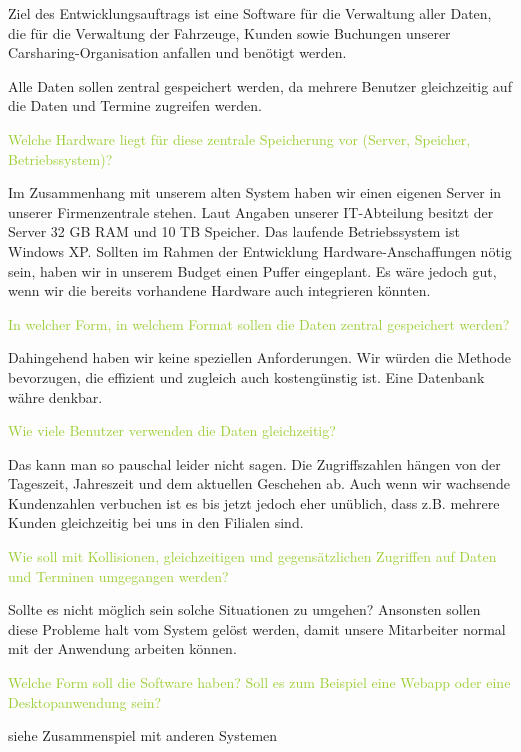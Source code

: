 Ziel des Entwicklungsauftrags ist eine Software für die Verwaltung aller Daten, die für die Verwaltung der Fahrzeuge, Kunden sowie Buchungen unserer Carsharing-Organisation anfallen und benötigt werden. 

Alle Daten sollen zentral gespeichert werden, da mehrere Benutzer gleichzeitig auf die Daten und Termine zugreifen werden. 

\textcolor{YellowGreen}{Welche Hardware liegt für diese zentrale Speicherung vor (Server, Speicher, Betriebssystem)?}

\textcolor{NavyBlue}{Im Zusammenhang mit unserem alten System haben wir einen eigenen Server in unserer Firmenzentrale stehen. Laut Angaben unserer IT-Abteilung besitzt der Server 32 GB RAM und 10 TB Speicher. Das laufende Betriebssystem ist Windows XP.
Sollten im Rahmen der Entwicklung Hardware-Anschaffungen nötig sein, haben wir in unserem Budget einen Puffer eingeplant. Es wäre jedoch gut, wenn wir die bereits vorhandene Hardware auch integrieren könnten.}

\textcolor{YellowGreen}{In welcher Form, in welchem Format sollen die Daten zentral gespeichert werden?}

\textcolor{NavyBlue}{Dahingehend haben wir keine speziellen Anforderungen. Wir würden die Methode bevorzugen, die effizient und zugleich auch kostengünstig ist. Eine Datenbank währe denkbar.}

\textcolor{YellowGreen}{Wie viele Benutzer verwenden die Daten gleichzeitig?}

\textcolor{NavyBlue}{Das kann man so pauschal leider nicht sagen. Die Zugriffszahlen hängen von der Tageszeit, Jahreszeit und dem aktuellen Geschehen ab. Auch wenn wir wachsende Kundenzahlen verbuchen ist es bis jetzt jedoch eher unüblich, dass z.B. mehrere Kunden gleichzeitig bei uns in den Filialen sind. }

\textcolor{YellowGreen}{Wie soll mit Kollisionen, gleichzeitigen und gegensätzlichen Zugriffen auf Daten und Terminen umgegangen werden?}

\textcolor{NavyBlue}{Sollte es nicht möglich sein solche Situationen zu umgehen? Ansonsten sollen diese Probleme halt vom System gelöst werden, damit unsere Mitarbeiter normal mit der Anwendung arbeiten können.}

\textcolor{YellowGreen}{Welche Form soll die Software haben? Soll es zum Beispiel eine Webapp oder eine Desktopanwendung sein?}

\textcolor{NavyBlue}{siehe Zusammenspiel mit anderen Systemen}

